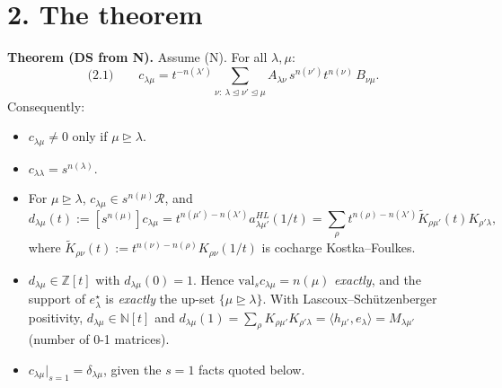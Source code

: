 \documentclass[10pt]{article}
\newcommand{\R}{\mathcal{R}}
\newcommand{\Kt}{\widetilde K}
\newcommand{\dom}{\trianglerighteq}
\newcommand{\domle}{\trianglelefteq}
\begin{document}
\section*{2. The theorem}
\noindent\textbf{Theorem (DS from N).} Assume (N). For all $\lambda,\mu$:
\[
\text{(2.1)}\qquad c_{\lambda\mu}=t^{-n(\lambda')}\sum_{\nu:\ \lambda\domle\nu'\domle\mu}A_{\lambda\nu}\,s^{n(\nu')}t^{n(\nu)}\,B_{\nu\mu}.
\]
Consequently:
\begin{itemize}
\item[\textbf{(S)}] $c_{\lambda\mu}\ne0$ only if $\mu\dom\lambda$.
\item[\textbf{(L)}] $c_{\lambda\lambda}=s^{n(\lambda)}$.
\item[\textbf{(Val)}] For $\mu\dom\lambda$, $c_{\lambda\mu}\in s^{n(\mu)}\R$, and
\[
d_{\lambda\mu}(t):=[s^{n(\mu)}]c_{\lambda\mu}=t^{n(\mu')-n(\lambda')}a^{HL}_{\lambda\mu'}(1/t)=\sum_\rho t^{n(\rho)-n(\lambda')}\Kt_{\rho\mu'}(t)K_{\rho'\lambda},
\]
where $\Kt_{\rho\nu}(t):=t^{n(\nu)-n(\rho)}K_{\rho\nu}(1/t)$ is cocharge Kostka--Foulkes.
\item[\textbf{(D)}] $d_{\lambda\mu}\in\mathbb Z[t]$ with $d_{\lambda\mu}(0)=1$. Hence $\mathrm{val}_sc_{\lambda\mu}=n(\mu)$ \emph{exactly}, and the support of $e^\star_\lambda$ is \emph{exactly} the up-set $\{\mu\dom\lambda\}$. With Lascoux--Sch\"utzenberger positivity, $d_{\lambda\mu}\in\mathbb N[t]$ and $d_{\lambda\mu}(1)=\sum_\rho K_{\rho\mu'}K_{\rho'\lambda}=\langle h_{\mu'},e_\lambda\rangle=M_{\lambda\mu'}$ (number of 0-1 matrices).
\item[\textbf{(V)}] $c_{\lambda\mu}|_{s=1}=\delta_{\lambda\mu}$, given the $s=1$ facts quoted below.
\end{itemize}
\end{document}
